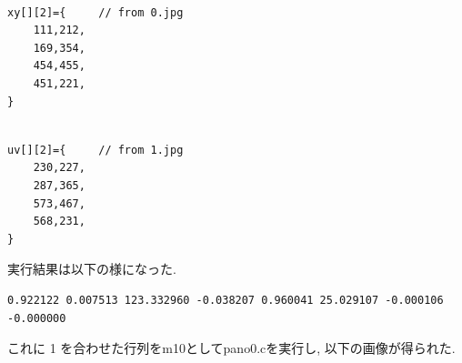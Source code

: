\documentclass[a4j]{jarticle}
\begin{document}
\begin{minipage}{0.5\hsize}
\begin{verbatim}

xy[][2]={     // from 0.jpg
    111,212,
    169,354,
    454,455,
    451,221,
}

\end{verbatim}
\end{minipage}
\begin{minipage}{0.5\hsize}
\begin{verbatim}

uv[][2]={     // from 1.jpg
    230,227,
    287,365,
    573,467,
    568,231,
}

\end{verbatim}
\end{minipage}
実行結果は以下の様になった.
\begin{verbatim}
0.922122 0.007513 123.332960 -0.038207 0.960041 25.029107 -0.000106 -0.000000
\end{verbatim}
これに 1 を合わせた行列をm10としてpano0.cを実行し, 以下の画像が得られた.
\newpage
\end{document}
